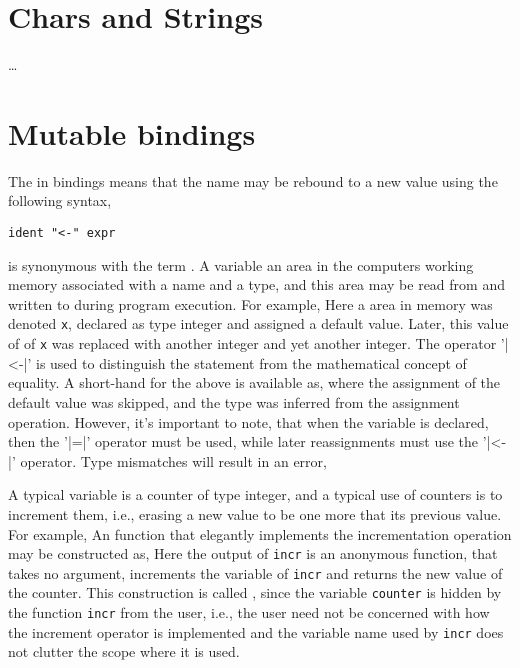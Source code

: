 \section{Chars and Strings}
\dots

\section{Mutable bindings}
\label{sec:mutableValues}
The  in  bindings means that the name may be rebound to a new value using the following syntax,
\begin{lstlisting}[language=EBNF]
ident "<-" expr
\end{lstlisting}
 is synonymous with the term . A variable an area in the computers working memory associated with a name and a type, and this area may be read from and written to during program execution. For example,
Here a area in memory was denoted \texttt{x}, declared as type integer and assigned a default value.  Later, this value of of \texttt{x} was replaced with another integer and yet another integer. The operator '\token|<-|' is used to distinguish the statement from the mathematical concept of equality. A short-hand for the above is available as,
where the assignment of the default value was skipped, and the type was inferred from the assignment operation. However, it's important to note, that when the variable is declared, then the '\token|=|' operator must be used, while later reassignments must use the '\token|<-|'  operator. Type mismatches will result in an error, 

A typical variable is a counter of type integer, and a typical use of counters is to increment them, i.e., erasing a new value to be one more that its previous value. For example,
An function that elegantly implements the incrementation operation may be constructed as,
 Here the output of \texttt{incr} is an anonymous function, that takes no argument, increments the variable of \texttt{incr} and returns the new value of the counter. This construction is called , since the variable \texttt{counter} is hidden by the function \texttt{incr} from the user, i.e., the user need not be concerned with how the increment operator is implemented and the variable name used by \texttt{incr} does not clutter the scope where it is used.

